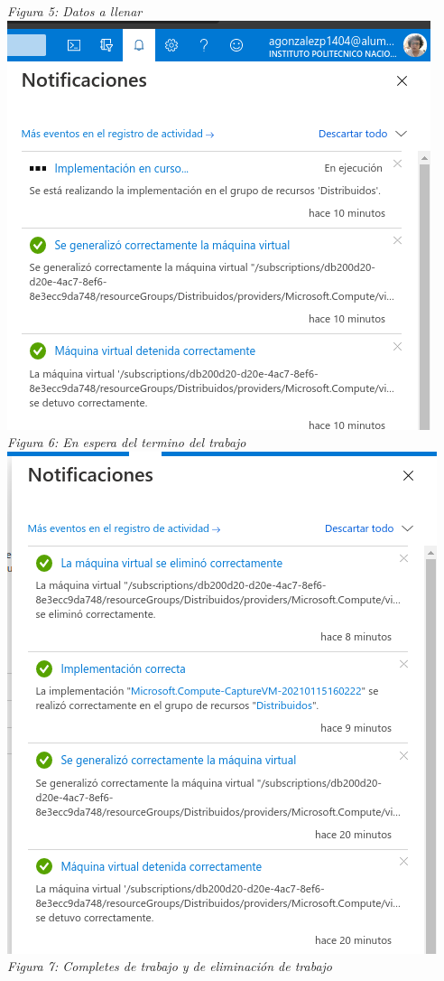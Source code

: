 \documentclass[10pt,executivepaper]{article}
\begin{document}
\begin{center}
  \textit{Figura 5: Datos a llenar}\\
  \includegraphics[scale=0.5]{imgs/6.png}\\
  \textit{Figura 6: En espera del termino del trabajo}\\
  \includegraphics[scale=0.5]{imgs/7.png}\\
  \textit{Figura 7: Completes de trabajo y de eliminación de trabajo}
\end{center}
\end{document}
